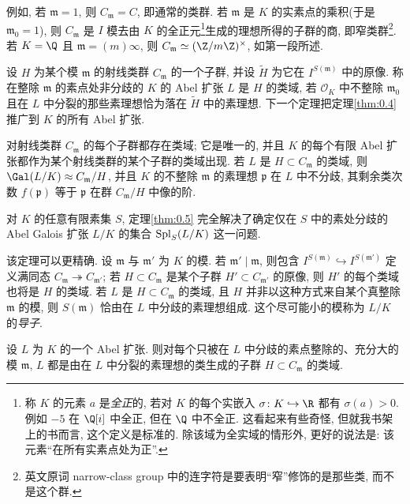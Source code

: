 例如, 若 $\mathfrak{m} = 1$, 则 $C_{\mathfrak{m}} = C$, 即通常的类群. 若 $\mathfrak{m}$ 是 $K$ 的实素点的乘积(于是 $\mathfrak{m}_{0} = 1$), 则 $C_{\mathfrak{m}}$ 是 $I$ 模去由 $K$ 的全正元\footnote{称 $K$ 的元素 $a$ 是\emph{全正}的, 若对 $K$ 的每个实嵌入 $\sigma\colon K\hookrightarrow\R$ 都有 $\sigma(a)>0$. 例如 $-5$ 在 $\Q[i]$ 中全正, 但在 $\Q$ 中不全正. 这看起来有些奇怪, 但就我书架上的书而言, 这个定义是标准的. 除该域为全实域的情形外, 更好的说法是: 该元素“在所有实素点处为正”. }生成的理想所得的子群的商, 即窄类群\footnote{英文原词 narrow-class group 中的连字符是要表明“窄”修饰的是那些类, 而不是这个群. }. 若 $K = \Q$ 且 $\mathfrak{m} = (m)\infty$, 则 $C_{\mathfrak{m}} \simeq (\Z/m\Z)^{\times}$, 如第一段所述.

设 $H$ 为某个模 $\mathfrak{m}$ 的射线类群 $C_{\mathfrak{m}}$ 的一个子群, 并设 $\tilde{H}$ 为它在 $I^{S(\mathfrak{m})}$ 中的原像. 称在整除 $\mathfrak{m}$ 的素点处非分歧的 $K$ 的 Abel 扩张 $L$ 是 $H$ 的类域, 若 $\mathcal{O}_{K}$ 中不整除 $\mathfrak{m}_{0}$ 且在 $L$ 中分裂的那些素理想恰为落在 $\tilde{H}$ 中的素理想. 下一个定理把定理\ref{thm:0.4} 推广到 $K$ 的所有 Abel 扩张.

\begin{theorem}[TAKAGI]\label{thm:0.5}
对射线类群 $C_{\mathfrak{m}}$ 的每个子群都存在类域; 它是唯一的, 并且 $K$ 的每个有限 Abel 扩张都作为某个射线类群的某个子群的类域出现. 若 $L$ 是 $H \subset C_{\mathfrak{m}}$ 的类域, 则 $\Gal(L/K) \approx C_{\mathfrak{m}}/H$, 并且 $K$ 的不整除 $\mathfrak{m}$ 的素理想 $\mathfrak{p}$ 在 $L$ 中不分歧, 其剩余类次数 $f(\mathfrak{p})$ 等于 $\mathfrak{p}$ 在群 $C_{\mathfrak{m}}/H$ 中像的阶.
\end{theorem}

对 $K$ 的任意有限素集 $S$, 定理\ref{thm:0.5} 完全解决了确定仅在 $S$ 中的素处分歧的 Abel Galois 扩张 $L/K$ 的集合 $\operatorname{Spl}_S(L/K)$ 这一问题.

该定理可以更精确. 设 $\mathfrak{m}$ 与 $\mathfrak{m}'$ 为 $K$ 的模. 若 $\mathfrak{m}' \mid \mathfrak{m}$, 则包含 $I^{S(\mathfrak{m})} \hookrightarrow I^{S(\mathfrak{m}')}$ 定义满同态 $C_{\mathfrak{m}} \twoheadrightarrow C_{\mathfrak{m}'}$; 若 $H \subset C_{\mathfrak{m}}$ 是某个子群 $H' \subset C_{\mathfrak{m}'}$ 的原像, 则 $H'$ 的每个类域也将是 $H$ 的类域. 若 $L$ 是 $H \subset C_{\mathfrak{m}}$ 的类域, 且 $H$ 并非以这种方式来自某个真整除 $\mathfrak{m}$ 的模, 则 $S(\mathfrak{m})$ 恰由在 $L$ 中分歧的素理想组成. 这个尽可能小的模称为 $L/K$ 的\emph{导子}.

设 $L$ 为 $K$ 的一个 Abel 扩张. 则对每个只被在 $L$ 中分歧的素点整除的、充分大的模 $\mathfrak{m}$, $L$ 都是由在 $L$ 中分裂的素理想的类生成的子群 $H \subset C_{\mathfrak{m}}$ 的类域.

